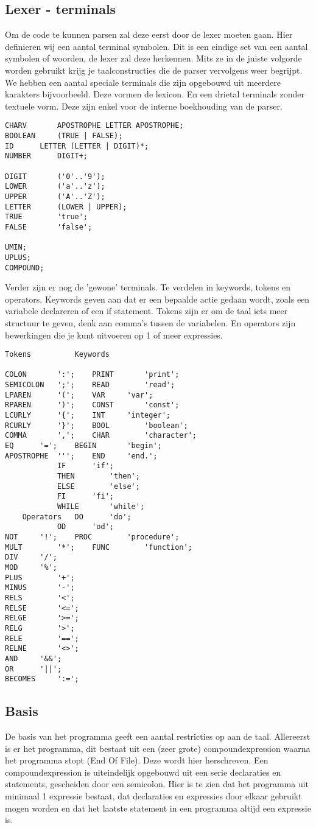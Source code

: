 \documentclass[]{article}
\begin{document}
\subsection{Lexer - terminals}
Om de code te kunnen parsen zal deze eerst door de lexer moeten gaan. Hier definieren wij een aantal terminal symbolen. Dit is een eindige set van een aantal symbolen of woorden, de lexer zal deze herkennen. Mits ze in de juiste volgorde worden gebruikt krijg je taalconstructies die de parser vervolgens weer begrijpt. We hebben een aantal speciale terminals die zijn opgebouwd uit meerdere karakters bijvoorbeeld. Deze vormen de lexicon. En een drietal terminals zonder textuele vorm. Deze zijn enkel voor de interne boekhouding van de parser.
\\
\begin{lstlisting}[style=ANTLR]
CHARV		APOSTROPHE LETTER APOSTROPHE;
BOOLEAN		(TRUE | FALSE);
ID		LETTER (LETTER | DIGIT)*;
NUMBER		DIGIT+;
	
DIGIT		('0'..'9');
LOWER		('a'..'z');
UPPER		('A'..'Z');
LETTER		(LOWER | UPPER);
TRUE		'true';
FALSE		'false';

UMIN;
UPLUS;
COMPOUND;			
\end{lstlisting}

\newpage 

Verder zijn er nog de 'gewone' terminals. Te verdelen in keywords, tokens en operators. Keywords geven aan dat er een bepaalde actie gedaan wordt, zoals een variabele declareren of een if statement. Tokens zijn er om de taal iets meer structuur te geven, denk aan comma's tussen de variabelen. En operators zijn bewerkingen die je kunt uitvoeren op 1 of meer expressies.
\\
\begin{lstlisting}[style=ANTLR]
	Tokens			Keywords
	
COLON		':';	PRINT		'print';
SEMICOLON	';';	READ		'read';
LPAREN		'(';	VAR		'var';
RPAREN		')';	CONST		'const';
LCURLY		'{';	INT		'integer';
RCURLY		'}';	BOOL		'boolean';
COMMA		',';	CHAR		'character';
EQ		'=';	BEGIN		'begin';
APOSTROPHE	''';	END		'end.';
			IF		'if';
			THEN		'then';
			ELSE		'else';
			FI		'fi';
			WHILE		'while';
	Operators	DO		'do';
			OD		'od';
NOT		'!';	PROC		'procedure';
MULT		'*';	FUNC		'function';
DIV		'/';
MOD		'%';
PLUS		'+';
MINUS		'-';
RELS		'<';
RELSE		'<=';
RELGE		'>=';
RELG		'>';
RELE		'==';
RELNE		'<>';
AND		'&&';
OR		'||';
BECOMES		':=';
\end{lstlisting}
\newpage
\subsection{Basis}
De basis van het programma geeft een aantal restricties op aan de taal.
Allereerst is er het programma, dit bestaat uit een (zeer grote) compoundexpression waarna het programma stopt (End Of File). Deze wordt hier herschreven. Een compoundexpression is uiteindelijk opgebouwd uit een serie declaraties en statements, gescheiden door een semicolon. Hier is te zien dat het programma uit minimaal 1 expressie bestaat, dat declaraties en expressies door elkaar gebruikt mogen worden en dat het laatste statement in een programma altijd een expressie is.

\end{document}
